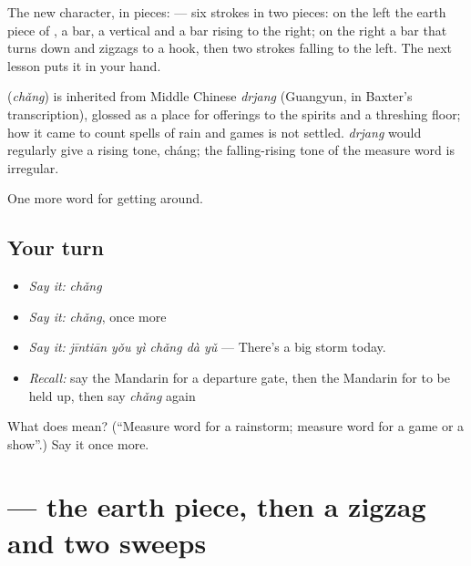 The new character, in pieces:  — six strokes in two pieces: on the left the earth piece of , a bar, a vertical and a bar rising to the right; on the right a bar that turns down and zigzags to a hook, then two strokes falling to the left. The next lesson puts it in your hand.

\begin{cousinweb}
\textbf{} (\emph{chǎng}) is inherited from Middle Chinese \emph{drjang} (Guangyun, in Baxter's transcription), glossed as a place for offerings to the spirits and a threshing floor; how it came to count spells of rain and games is not settled. \emph{drjang} would regularly give a rising tone, cháng; the falling-rising tone of the measure word is irregular.
\end{cousinweb}

\begin{grammarlens}[title={What you've built}]
One more word for getting around.
\end{grammarlens}

\subsection*{Your turn}
\begin{itemize}
\raggedright
  \item \emph{Say it:} \emph{chǎng}
  \item \emph{Say it:} \emph{chǎng}, once more
  \item \emph{Say it:} \emph{jīntiān yǒu yì chǎng dà yǔ} — There's a big storm today.
  \item \emph{Recall:} say the Mandarin for a departure gate, then the Mandarin for to be held up, then say \emph{chǎng} again
\end{itemize}

\begin{tcolorbox}[breakable,colback=teal!4,colframe=teal!35!black,title={Before you move on}]
What does  mean? (\textquotedblleft{}Measure word for a rainstorm; measure word for a game or a show\textquotedblright{}.) Say it once more.
\end{tcolorbox}
\section[\texorpdfstring{\zh{场} (chǎng)}{场 (chǎng)}]{ — the earth piece, then a zigzag and two sweeps}

\label{lesson:ZH-W416-chang-ground}



